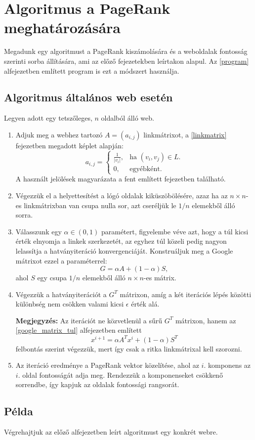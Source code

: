 \documentclass[12pt,a4paper]{article}
\begin{document}
\section{Algoritmus a PageRank meghatározására}

Megadunk egy algoritmust a PageRank kiszámolására és a weboldalak fontosság szerinti sorba állítására, ami az előző fejezetekben leírtakon alapul. Az \ref{program} alfejezetben említett program is ezt a módszert használja.

\subsection{Algoritmus általános web esetén}

Legyen adott egy tetszőleges, $n$ oldalból álló web.

\begin{enumerate}[label=(\Roman*)]
	\item Adjuk meg a webhez tartozó $A = (a_{i,j})$ linkmátrixot, a \ref{linkmatrix} fejezetben megadott képlet alapján: 
	\begin{equation*}
	a_{i,j}=\begin{cases}
	\frac{1}{ |v_i| }, & \text{ha $(v_i,v_j) \in L$}.\\
	0, & \text{egyébként}.
	\end{cases}
	\end{equation*}
	A használt jelölések magyarázata a fent említett fejezetben található.
	
	\item Végezzük el a helyettesítést a lógó oldalak kiküszöbölésére, azaz ha az $n \times n$-es linkmátrixban van csupa nulla sor, azt cseréljük le $1/n$ elemekből álló sorra.
	
	\item Válasszunk egy $\alpha \in (0,1)$ paramétert, figyelembe véve azt, hogy a túl kicsi érték elnyomja a linkek szerkezetét, az egyhez túl közeli pedig nagyon lelassítja a hatványiteráció konvergenciáját. Konstruáljuk meg a Google mátrixot ezzel a paraméterrel:
	\[G = \alpha A + (1-\alpha)S,\]
	ahol $S$ egy csupa $1/n$ elemekből álló $n \times n$-es mátrix. 
	
	\item Végezzük a hatványiterációt a $G^T$ mátrixon, amíg a két iterációs lépés közötti különbség nem csökken valami kicsi $\epsilon$ érték alá. 
	
	\textbf{Megjegyzés:} Az iterációt ne közvetlenül a sűrű $G^T$ mátrixon, hanem az \ref{google_matrix_tul} alfejezetben említett
	\[ x^{i+1} = \alpha A^T x^i + (1-\alpha) S^T \] 
	felbontás szerint végezzük, mert így csak a ritka linkmátrixal kell szorozni.
	
	\item Az iteráció eredménye a PageRank vektor közelítése, ahol az $i.$ komponens az $i.$ oldal fontosságát adja meg. Rendezzük a komponenseket csökkenő sorrendbe, így kapjuk az oldalak fontossági rangsorát.
	
\end{enumerate}

\subsection{Példa}

Végrehajtjuk az előző alfejezetben leírt algoritmust egy konkrét webre.



\end{document}
